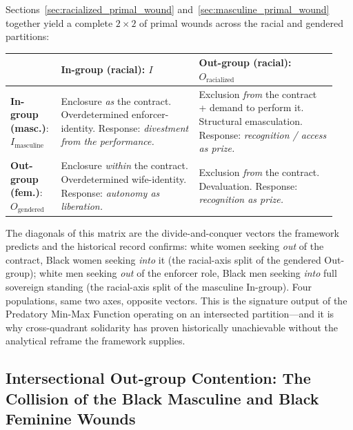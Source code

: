 Sections~\ref{sec:racialized_primal_wound} and~\ref{sec:masculine_primal_wound} together yield a complete $2 \times 2$ of primal wounds across the racial and gendered partitions:

\begin{center}
\begin{tcolorbox}[colback=black!3, colframe=black!70, arc=2pt, boxrule=0.6pt, width=\linewidth]
\renewcommand{\arraystretch}{1.35}
\small
\begin{tabular}{@{}p{0.14\linewidth}|p{0.40\linewidth}|p{0.40\linewidth}@{}}
 & \textbf{In-group (racial)}: $I$ & \textbf{Out-group (racial)}: $O_{\text{racialized}}$ \\
\hline
\textbf{In-group (masc.)}: $I_{\text{masculine}}$ & Enclosure \textit{as} the contract. Overdetermined enforcer-identity. Response: \textit{divestment from the performance.} & Exclusion \textit{from} the contract + demand to perform it. Structural emasculation. Response: \textit{recognition / access as prize.} \\
\hline
\textbf{Out-group (fem.)}: $O_{\text{gendered}}$ & Enclosure \textit{within} the contract. Overdetermined wife-identity. Response: \textit{autonomy as liberation.} & Exclusion \textit{from} the contract. Devaluation. Response: \textit{recognition as prize.} \\
\end{tabular}
\end{tcolorbox}
\end{center}

The diagonals of this matrix are the divide-and-conquer vectors the framework predicts and the historical record confirms: white women seeking \textit{out} of the contract, Black women seeking \textit{into} it (the racial-axis split of the gendered Out-group); white men seeking \textit{out} of the enforcer role, Black men seeking \textit{into} full sovereign standing (the racial-axis split of the masculine In-group). Four populations, same two axes, opposite vectors. This is the signature output of the Predatory Min-Max Function operating on an intersected partition---and it is why cross-quadrant solidarity has proven historically unachievable without the analytical reframe the framework supplies.

\subsection{Intersectional Out-group Contention: The Collision of the Black Masculine and Black Feminine Wounds}
\label{sec:intraracial_contention}

